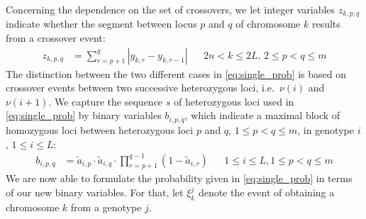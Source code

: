 \documentclass[runningheads]{llncs}
\begin{document}
Concerning the dependence on the set of crossovers, we let integer variables $z_{k,p,q}$ indicate whether the segment between locus $p$ and $q$ of chromosome $k$ results from a crossover event:
\begin{align}
  z_{k,p,q} & = \sum_{r=p+1}^q |y_{k,r} - y_{k,r-1}| && 2n < k \leq 2L,\, 2 \leq p < q \leq m
\end{align}
The distinction between the two different cases in \eqref{eq:single_prob} is based on crossover events
between two successive heterozygous loci, i.e.~$\nu(i)$ and $\nu(i+1)$. We capture the sequence $s$ of heterozygous
loci used in \eqref{eq:single_prob} by binary variables $b_{i,p,q}$, which indicate a
maximal block of homozygous loci between heterozygous loci $p$ and $q$, $1 \leq p<q \leq m$, in genotype $i$, $1 \leq i \leq L$:
\begin{align}
  b_{i,p,q} & = \tilde{a}_{i,p}\cdot\tilde{a}_{i,q}\cdot\prod_{r=p+1}^{q-1}(1-\tilde{a}_{i,r})  && 1 \leq i \leq L, 1 \leq p<q \leq m
\end{align}
We are now able to formulate the probability given in \eqref{eq:single_prob} in terms of our new binary variables. For that, let $\xi_k^j$ denote
the event of obtaining a chromosome $k$ from a genotype $j$. %
\end{document}
